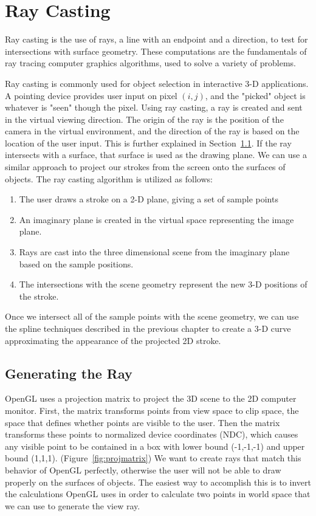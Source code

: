 \section{Ray Casting}

Ray casting is the use of rays, a line with an endpoint and a direction, to test for intersections with surface geometry.
These computations are the fundamentals of ray tracing computer graphics algorithms, used to solve a variety of problems.

Ray casting is commonly used for object selection in interactive 3-D applications.
A pointing device provides user input on pixel $(i,j)$, and the "picked" object is whatever is "seen" though the pixel.
Using ray casting, a ray is created and sent in the virtual viewing direction.
The origin of the ray is the position of the camera in the virtual environment, and the direction of the ray is based on the location of the user input.
This is further explained in Section~\ref{sec:raygen}.
If the ray intersects with a surface, that surface is used as the drawing plane.
We can use a similar approach to project our strokes from the screen onto the surfaces of objects.
The ray casting algorithm is utilized as follows:
\begin{enumerate}
\item The user draws a stroke on a 2-D plane, giving a set of sample points
\item An imaginary plane is created in the virtual space representing the image plane.
\item Rays are cast into the three dimensional scene from the imaginary plane based on the sample positions.
\item The intersections with the scene geometry represent the new 3-D positions of the stroke.
\end{enumerate}
Once we intersect all of the sample points with the scene geometry, we can use the spline techniques described in the previous chapter to create a 3-D curve approximating the appearance of the projected 2D stroke.

\subsection{Generating the Ray}
\label{sec:raygen}

OpenGL uses a projection matrix to project the 3D scene to the 2D computer monitor.
First, the matrix transforms points from view space to clip space, the space that defines whether points are visible to the user.
Then the matrix transforms these points to normalized device coordinates (NDC), which causes any visible point to be contained in a box with lower bound (-1,-1,-1) and upper bound (1,1,1). (Figure~\ref{fig:projmatrix})
We want to create rays that match this behavior of OpenGL perfectly, otherwise the user will not be able to draw properly on the surfaces of objects.
The easiest way to accomplish this is to invert the calculations OpenGL uses in order to calculate two points in world space that we can use to generate the view ray.

